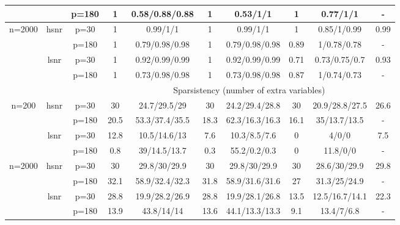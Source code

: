 \begin{table}[ht]
{\begin{tabular}{|c|c|c|cc|cc|cc|c|}
   &  & p=180 & 1 & 0.58/0.88/0.88 & 1 & 0.53/1/1 & 1 & 0.77/1/1 & - \\ 
  \midrule \multirow{4}[4]{*}{n=2000} & \multirow{2}[2]{*}{hsnr} & p=30 & 1 & 0.99/1/1 & 1 & 0.99/1/1 & 1 & 0.85/1/0.99 & 0.99 \\ 
   &  & p=180 & 1 & 0.79/0.98/0.98 & 1 & 0.79/0.98/0.98 & 0.89 & 1/0.78/0.78 & - \\ 
  \cmidrule{2-10} & \multirow{2}[2]{*}{lsnr} & p=30 & 1 & 0.92/0.99/0.99 & 1 & 0.92/0.99/0.99 & 0.71 & 0.73/0.75/0.7 & 0.93 \\ 
   &  & p=180 & 1 & 0.73/0.98/0.98 & 1 & 0.73/0.98/0.98 & 0.87 & 1/0.74/0.73 & - \\ 
   \midrule 
 \multicolumn{1}{|r}{} & \multicolumn{1}{r}{} &       & \multicolumn{7}{c|}{Sparsistency (number of extra variables)} \\
 \midrule 
\multirow{4}[4]{*}{n=200} & \multirow{2}[2]{*}{hsnr} & p=30 & 30 & 24.7/29.5/29 & 30 & 24.2/29.4/28.8 & 30 & 20.9/28.8/27.5 & 26.6 \\ 
   &  & p=180 & 20.5 & 53.3/37.4/35.5 & 18.3 & 62.3/16.3/16.3 & 16.1 & 35/13.7/13.5 & - \\ 
  \cmidrule{2-10} & \multirow{2}[2]{*}{lsnr} & p=30 & 12.8 & 10.5/14.6/13 & 7.6 & 10.3/8.5/7.6 & 0 & 4/0/0 & 7.5 \\ 
   &  & p=180 & 0.8 & 39/14.5/13.7 & 0.3 & 55.2/0.2/0.3 & 0 & 11.8/0/0 & - \\ 
  \midrule \multirow{4}[4]{*}{n=2000} & \multirow{2}[2]{*}{hsnr} & p=30 & 30 & 29.8/30/29.9 & 30 & 29.8/30/29.9 & 30 & 28.6/30/29.9 & 29.8 \\ 
   &  & p=180 & 32.1 & 58.9/32.4/32.3 & 31.8 & 58.9/31.6/31.6 & 27 & 31.3/25/24.9 & - \\ 
  \cmidrule{2-10} & \multirow{2}[2]{*}{lsnr} & p=30 & 28.8 & 19.9/28.2/26.9 & 28.8 & 19.9/28.1/26.8 & 13.5 & 12.5/16.7/14.1 & 22.3 \\ 
   &  & p=180 & 13.9 & 43.8/14/14 & 13.6 & 44.1/13.3/13.3 & 9.1 & 13.4/7/6.8 & - \\ 
   \bottomrule 
\end{tabular}
}
\end{table}
